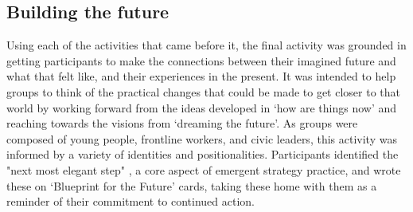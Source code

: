 \subsection{Building the future}
Using each of the activities that came before it, the final activity was grounded in getting participants to make the connections between their imagined future and what that felt like, and their experiences in the present. It was intended to help groups to think of the practical changes that could be made to get closer to that world by working forward from the ideas developed in `how are things now' and reaching towards the visions from `dreaming the future'. As groups were composed of young people, frontline workers, and civic leaders, this activity was informed by a variety of identities and positionalities. Participants identified the "next most elegant step" \citep[p. 220]{brown_emergent_2017}, a core aspect of emergent strategy practice, and wrote these on ‘Blueprint for the Future’ cards, taking these home with them as a reminder of their commitment to continued action. 

